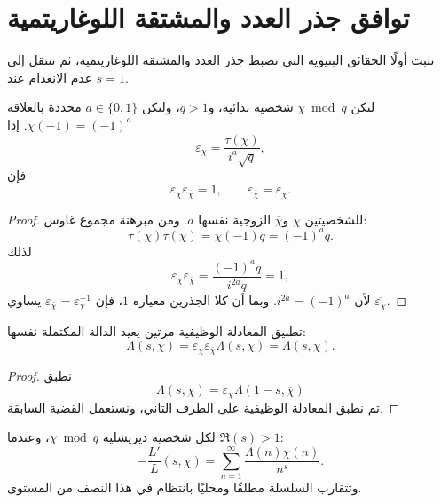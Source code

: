 \section{توافق جذر العدد والمشتقة اللوغاريتمية}

نثبت أولًا الحقائق البنيوية التي تضبط جذر العدد والمشتقة
اللوغاريتمية، ثم ننتقل إلى عدم الانعدام عند \(s=1\).

\begin{proposition}
\label{prop:dirichlet-root-number-compatibility}
\provedhere
لتكن \(\chi\bmod q\) شخصية بدائية، و\(q>1\)، ولتكن
\(a\in\{0,1\}\) محددة بالعلاقة \(\chi(-1)=(-1)^a\). إذا
\[
\varepsilon_\chi=\frac{\tau(\chi)}{i^a\sqrt q},
\]
فإن
\[
\varepsilon_\chi\varepsilon_{\overline\chi}=1,
\qquad
\varepsilon_{\overline\chi}=\overline{\varepsilon_\chi}.
\]
\end{proposition}

\begin{proof}
للشخصيتين \(\chi\) و\(\overline\chi\) الزوجية نفسها \(a\). ومن مبرهنة
مجموع غاوس:
\[
\tau(\chi)\tau(\overline\chi)=\chi(-1)q=(-1)^a q.
\]
لذلك
\[
\varepsilon_\chi\varepsilon_{\overline\chi}
=
\frac{(-1)^a q}{i^{2a}q}=1,
\]
لأن \(i^{2a}=(-1)^a\). وبما أن كلا الجذرين معياره \(1\)، فإن
\(\varepsilon_{\overline\chi}=\varepsilon_\chi^{-1}\) يساوي
\(\overline{\varepsilon_\chi}\).
\end{proof}

\begin{corollary}
\label{cor:functional-equation-involution}
\provedhere
تطبيق المعادلة الوظيفية مرتين يعيد الدالة المكتملة نفسها:
\[
\Lambda(s,\chi)
=
\varepsilon_\chi\varepsilon_{\overline\chi}\Lambda(s,\chi)
=
\Lambda(s,\chi).
\]
\end{corollary}

\begin{proof}
نطبق
\[
\Lambda(s,\chi)=\varepsilon_\chi\Lambda(1-s,\overline\chi)
\]
ثم نطبق المعادلة الوظيفية على الطرف الثاني، ونستعمل القضية السابقة.
\end{proof}

\begin{proposition}
\label{prop:dirichlet-l-logarithmic-derivative}
\provedhere
لكل شخصية ديريشليه \(\chi\bmod q\)، وعندما \(\Re(s)>1\):
\[
-\frac{L'}{L}(s,\chi)
=
\sum_{n=1}^{\infty}\frac{\Lambda(n)\chi(n)}{n^s}.
\]
وتتقارب السلسلة مطلقًا ومحليًا بانتظام في هذا النصف من المستوى.
\end{proposition}

